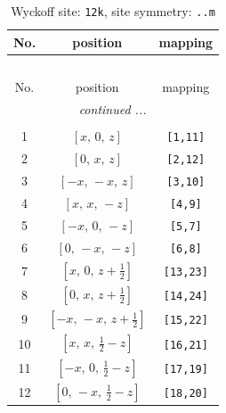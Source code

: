 \documentclass[fleqn,8pt]{jsarticle}
\begin{document}
\begin{longtable}{ccc}
\caption{Wyckoff site: {\tt 12k}, site symmetry: {\tt ..m}}
 \\
 \hline \hline
No. & position & mapping \\ \hline \endfirsthead

\multicolumn{2}{l}{\tablename\ \thetable{}} \\
 \hline \hline
No. & position & mapping \\ \hline \endhead

 \hline \hline
\multicolumn{2}{r}{\footnotesize\it continued ...} \\ \endfoot

 \hline \hline
\multicolumn{2}{r}{} \\ \endlastfoot

1 & $\left[ x,\, 0,\, z \right]$ & {\tt [1,11]} \\ \hline
2 & $\left[ 0,\, x,\, z \right]$ & {\tt [2,12]} \\ \hline
3 & $\left[ - x,\, - x,\, z \right]$ & {\tt [3,10]} \\ \hline
4 & $\left[ x,\, x,\, - z \right]$ & {\tt [4,9]} \\ \hline
5 & $\left[ - x,\, 0,\, - z \right]$ & {\tt [5,7]} \\ \hline
6 & $\left[ 0,\, - x,\, - z \right]$ & {\tt [6,8]} \\ \hline
7 & $\left[ x,\, 0,\, z + \frac{1}{2} \right]$ & {\tt [13,23]} \\ \hline
8 & $\left[ 0,\, x,\, z + \frac{1}{2} \right]$ & {\tt [14,24]} \\ \hline
9 & $\left[ - x,\, - x,\, z + \frac{1}{2} \right]$ & {\tt [15,22]} \\ \hline
10 & $\left[ x,\, x,\, \frac{1}{2} - z \right]$ & {\tt [16,21]} \\ \hline
11 & $\left[ - x,\, 0,\, \frac{1}{2} - z \right]$ & {\tt [17,19]} \\ \hline
12 & $\left[ 0,\, - x,\, \frac{1}{2} - z \right]$ & {\tt [18,20]} \\
\end{longtable}
\renewcommand{\arraystretch}{1.2}
\end{document}
